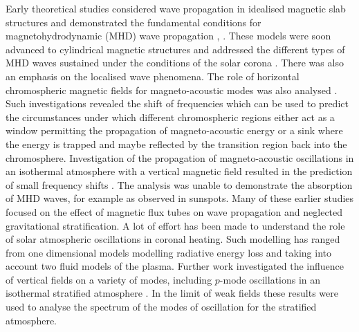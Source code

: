 \documentclass[physics,article,submit,pdftex,moreauthors]{Definitions/mdpi}
\begin{document}
Early theoretical studies   considered wave propagation in idealised magnetic slab structures and demonstrated the fundamental conditions for  magnetohydrodynamic (MHD) wave propagation  \cite{Roberts1981a}, \cite{Roberts1981b}. These models were soon advanced to cylindrical magnetic structures and addressed 
the different types of MHD waves sustained under the conditions of the solar corona \cite{EdwinandRoberts1983}.  There was also an emphasis on the localised wave phenomena.  The role of horizontal chromospheric magnetic fields for magneto-acoustic modes was also analysed \cite{Campbell1989}. Such investigations revealed the shift of frequencies which can be used to predict the circumstances under which different chromospheric regions either act as a window permitting the propagation of magneto-acoustic energy or  a sink where the energy is trapped and maybe reflected by the transition region back into the chromosphere. Investigation of the propagation of magneto-acoustic oscillations in an isothermal atmosphere with a vertical magnetic field resulted in the prediction of small frequency shifts \cite{Hindman1996}. The analysis was unable to demonstrate the absorption of MHD waves,  for example as observed in sunspots. Many of these  earlier studies  focused on the effect of magnetic flux tubes on wave propagation and neglected gravitational stratification. A lot of effort has been made to understand the role of solar atmospheric oscillations in coronal heating. Such modelling has ranged from one dimensional models modelling radiative energy loss  and taking into account two fluid models of the plasma. Further work investigated the influence of vertical fields on a variety of modes, including $p$-mode oscillations in an isothermal stratified atmosphere  \cite{Hasan1992}. In the limit of weak fields these results were used to analyse the spectrum of the modes of oscillation for the stratified atmosphere.
\end{document}
